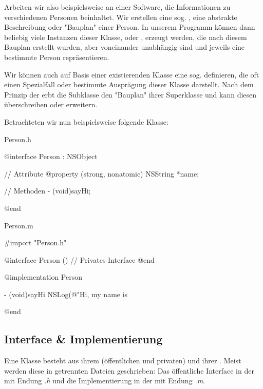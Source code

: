 \documentclass[parskip=half, final]{scrreprt}
\begin{document}
Arbeiten wir also beispielsweise an einer Software, die Informationen zu verschiedenen Personen beinhaltet. Wir erstellen eine sog. , eine abstrakte Beschreibung oder "Bauplan"{} einer Person. In unserem Programm können dann beliebig viele Instanzen dieser Klasse, oder , erzeugt werden, die nach diesem Bauplan erstellt wurden, aber voneinander unabhängig sind und jeweils eine bestimmte Person repräsentieren.

Wir können auch auf Basis einer existierenden Klasse eine sog.  definieren, die oft einen Spezialfall oder bestimmte Ausprägung dieser Klasse darstellt. Nach dem Prinzip der  erbt die Subklasse den "Bauplan"{} ihrer Superklasse und kann diesen überschreiben oder erweitern.

Betrachteten wir nun beispielsweise folgende Klasse:

\begin{filecontent}{Person.h}\label{sec:personclass}
\begin{objclst}
@interface Person : NSObject

// Attribute
@property (strong, nonatomic) NSString *name;

// Methoden
- (void)sayHi;

@end
\end{objclst}
\end{filecontent}

\begin{filecontent}{Person.m}
\begin{objclst}
#import "Person.h"

@interface Person ()
// Privates Interface
@end

@implementation Person

- (void)sayHi {
    NSLog(@"Hi, my name is %
}

@end
\end{objclst}
\end{filecontent}

\subsection{Interface \& Implementierung}\label{sec:intimpl}

Eine Klasse besteht aus ihrem (öffentlichen und privaten)  und ihrer . Meist werden diese in getrennten Dateien geschrieben: Das öffentliche Interface in der  mit Endung \emph{.h} und die Implementierung in der  mit Endung \emph{.m}.
\end{document}
